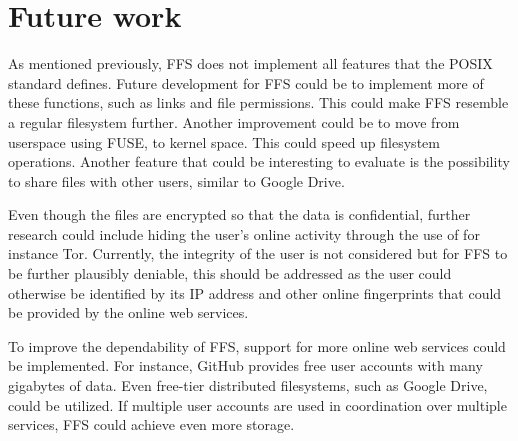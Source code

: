 
\section{Future work}
\label{sec:futureWork}

As mentioned previously, \gls{FFS} does not implement all features that the POSIX standard defines. Future development for \gls{FFS} could be to implement more of these functions, such as links and file permissions. This could make \gls{FFS} resemble a regular filesystem further. Another improvement could be to move from userspace using \gls{FUSE}, to kernel space. This could speed up filesystem operations. Another feature that could be interesting to evaluate is the possibility to share files with other users, similar to Google Drive.

Even though the files are encrypted so that the data is confidential, further research could include hiding the user's online activity through the use of for instance Tor. Currently, the integrity of the user is not considered but for \gls{FFS} to be further plausibly deniable, this should be addressed as the user could otherwise be identified by its IP address and other online fingerprints that could be provided by the online web services.

To improve the dependability of \gls{FFS}, support for more online web services could be implemented. For instance, GitHub provides free user accounts with many gigabytes of data. Even \mbox{free-tier} distributed filesystems, such as Google Drive, could be utilized. If multiple user accounts are used in coordination over multiple services, \gls{FFS} could achieve even more storage.




